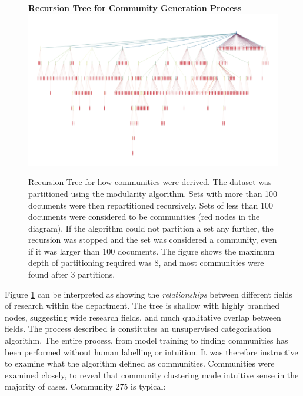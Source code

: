 \begin{center}
\begin{figure}[H]
  \centering
  \textbf{Recursion Tree for Community Generation Process}
    \includegraphics[width=\textwidth]{Analysis/comms.png}
    \caption[Recursion Tree for Document Community Generation]{Recursion Tree for how communities were derived. The dataset was partitioned using the modularity algorithm. Sets with more than 100 documents were then repartitioned recursively. Sets of less than 100 documents were considered to be communities (red nodes in the diagram). If the algorithm could not partition a set any further, the recursion was stopped and the set was considered a community, even if it was larger than 100 documents.  The figure shows the maximum depth of partitioning required was 8, and most communities were found after 3 partitions.}
    \label{fig:COMMTREE}

\end{figure} 
\end{center}
Figure \ref{fig:COMMTREE} can be interpreted as showing the \emph{relationships} between different fields of research within the department. The tree is shallow with highly branched nodes, suggesting wide research fields, and much qualitative overlap between fields.
The process described is constitutes an unsupervised categorisation algorithm. The entire process, from model training to finding communities has been performed without human labelling or intuition. It was therefore instructive to examine what the algorithm defined as communities.
Communities were examined closely, to reveal that community clustering made intuitive sense in the majority of cases. Community 275 is typical:
